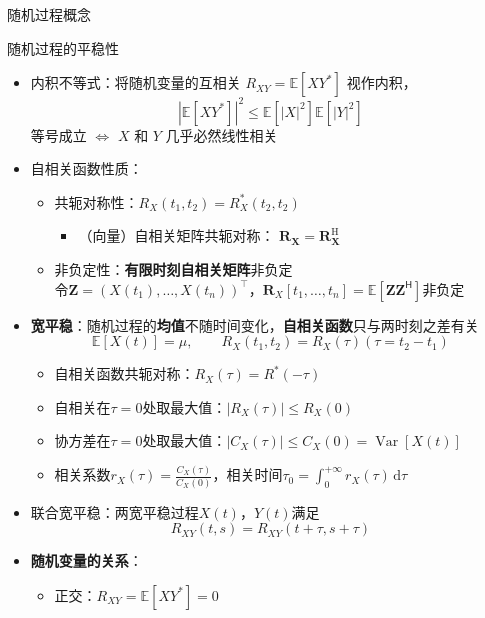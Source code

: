 \documentclass[landscape,a4paper]{ctexart}
\newcommand{\mean}[1]{\mathbb{E}\left[#1\right]}
\newcommand{\var}[1]{\operatorname{Var}\left[#1\right]}
\begin{document}
\begin{cheatsheetcolumns}
\begin{card}{随机过程概念}
\begin{itemize}
\begin{itemize}
					\end{itemize}
			\end{itemize}
		\end{card}
		\begin{card}{随机过程的平稳性}
			\begin{itemize}
				\item 内积不等式：将随机变量的互相关 $R_{XY}=\mean{XY^\ast}$ 视作内积，
				\[\left\lvert\mean{XY^\ast}\right\rvert^2\le \mean{\left\lvert X\right\rvert^2}\mean{\left\lvert Y\right\rvert^2}
				\]
				等号成立 $\Leftrightarrow$ $X$ 和 $Y$ 几乎必然线性相关
				\item 自相关函数性质：
				\begin{itemize}
					\item 共轭对称性：$R_X(t_1, t_2)=R_X^\ast(t_2, t_2)$
					\begin{itemize}
						\item （向量）自相关矩阵共轭对称：
						$
						\mathbf{R}_{\mathbf{X}}=\mathbf{R}_{\mathbf{X}}^{\mathrm{H}}
						$
					\end{itemize}
					\item 非负定性：\textbf{有限时刻自相关矩阵}非负定\\
					令$\mathbf{Z}=(X(t_1),\ldots,X(t_n))^\intercal$，$\mathbf{R}_X[t_1,\ldots,t_n]=\mathbb{E}[\mathbf{Z}\mathbf{Z}^{\mathsf{H}}]$非负定
				\end{itemize}
				\item \textbf{宽平稳}：随机过程的\textbf{均值}不随时间变化，\textbf{自相关函数}只与两时刻之差有关
				\[
				\mean{X(t)}=\mu,\qquad R_X(t_1, t_2)=R_X(\tau)(\tau=t_2-t_1)
				\]
				\begin{itemize}
					\item 自相关函数共轭对称：$R_X(\tau)=R^\ast(-\tau)$
					\item 自相关在$\tau=0$处取最大值：$\left|R_X(\tau)\right|\le R_X(0)$
					\item 协方差在$\tau=0$处取最大值：$\left|C_X(\tau)\right|\le C_X(0)=\var{X(t)}$
					\item 相关系数$r_X(\tau)=\frac{C_X(\tau)}{C_X(0)}$，相关时间$\tau_0=\int_0^{+\infty}r_X(\tau)\,\mathrm{d}\tau$
				\end{itemize}
				\item 联合宽平稳：两宽平稳过程$X(t)$，$Y(t)$满足
				\[
				R_{XY}(t,s)=R_{XY}(t+\tau, s+\tau)
				\]
				\item \textbf{随机变量的关系}：
				\begin{itemize}
					\item 正交：$R_{XY}=\mean{XY^\ast}=0$

\end{itemize}
\end{itemize}
\end{card}
\end{cheatsheetcolumns}
\end{document}
